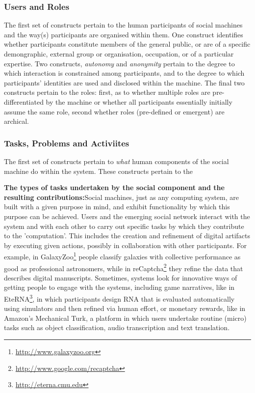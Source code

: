 \documentclass{sig-alternate}
\begin{document}
\subsubsection{Users and Roles}
The first set of constructs pertain to the human participants of
social machines and the way(s) participants are organised within them.
One construct identifies whether participants constitute members of
the general public, or are of a specific demongraphic, external group
or organisation, occupation, or of a particular expertise.  Two
constructs, \emph{autonomy} and \emph{anonymity} pertain to the degree
to which interaction is constrained among participants, and to the
degree to which participants' identities are used and disclosed within
the machine. The final two constructs pertain to the roles: first,
as to whether multiple roles are pre-differentiated by the machine or
whether all participants essentially initially assume the same role,
second whether roles (pre-defined or emergent) are archical.

\subsubsection{Tasks, Problems and Activiites}

The first set of constructs pertain to \emph{what} human components
of the social machine do within the system.  These constructs pertain
to the 

{\bf The types of tasks undertaken by the social component and the resulting contributions:}Social machines, just as any computing system, are built with a given purpose in mind, and exhibit functionality by which this purpose can be achieved. Users and the emerging social network interact with the system and with each other to carry out specific tasks by which they contribute to the 'computation'. This includes the creation and refinement of digital artifacts by executing given actions, possibly in collaboration with other participants. For example, in GalaxyZoo\footnote{\url{http://www.galaxyzoo.org}} people classify galaxies with collective performance as good as professional astronomers, while in reCaptcha\footnote{\url{http://www.google.com/recaptcha}} they refine the data that describes digital manuscripts. Sometimes, systems look for innovative ways of getting people to engage with the systems, including game narratives, like in EteRNA\footnote{\url{http://eterna.cmu.edu}}, in which  participants design RNA  that is evaluated automatically using simulators and then refined via human effort, or monetary rewards, like in Amazon's Mechanical Turk, a platform in which users undertake routine (micro) tasks such as object classification, audio transcription and text translation.
\end{document}
